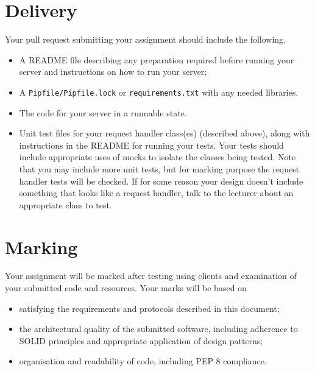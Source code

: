 \documentclass{article}
\begin{document}
\section{Delivery}
Your pull request submitting your assignment should include the following.

\begin{itemize}
  \item A README file describing any preparation required before running your server and instructions on how to run your server;
  \item A \texttt{Pipfile/Pipfile.lock} or \texttt{requirements.txt} with any needed libraries.
  \item The code for your server in a runnable state.
  \item Unit test files for your request handler class(es) (described above), along with instructions in the README for running your tests. Your tests should include appropriate uses of mocks to isolate the classes being tested. Note that you may include more unit tests, but for marking purpose the request handler tests will be checked. If for some reason your design doesn't include something that looks like a request handler, talk to the lecturer about an appropriate class to test.
\end{itemize}

\section{Marking}
Your assignment will be marked after testing using clients and examination of your submitted code and resources. Your marks will be based on
\begin{itemize}
  \item satisfying the requirements and protocols described in this document;
  \item the architectural quality of the submitted software, including adherence to SOLID principles and appropriate application of design patterns;
  \item organisation and readability of code, including PEP 8 compliance.
\end{itemize}



         
\end{document}
